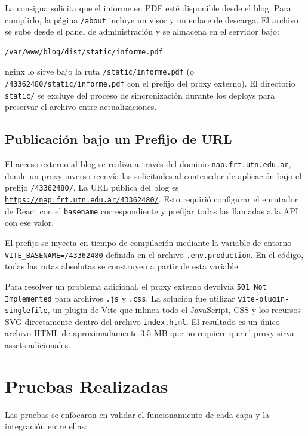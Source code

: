 \documentclass[twoside, 11pt, a4paper]{article}
\begin{document}
    La consigna solicita que el informe en PDF esté disponible desde el blog. Para cumplirlo, la página \texttt{/about} incluye un visor y un enlace de descarga. El archivo se sube desde el panel de administración y se almacena en el servidor bajo:

    \begin{verbatim}
/var/www/blog/dist/static/informe.pdf
    \end{verbatim}

    nginx lo sirve bajo la ruta \texttt{/static/informe.pdf} (o \texttt{/43362480/static/informe.pdf} con el prefijo del proxy externo). El directorio \texttt{static/} se excluye del proceso de sincronización durante los deploys para preservar el archivo entre actualizaciones.

    \subsection{Publicación bajo un Prefijo de URL}

    El acceso externo al blog se realiza a través del dominio \texttt{nap.frt.utn.edu.ar}, donde un proxy inverso reenvía las solicitudes al contenedor de aplicación bajo el prefijo \texttt{/43362480/}. La URL pública del blog es \href{https://nap.frt.utn.edu.ar/43362480/}{\texttt{https://nap.frt.utn.edu.ar/43362480/}}. Esto requirió configurar el enrutador de React con el \texttt{basename} correspondiente y prefijar todas las llamadas a la API con ese valor.

    El prefijo se inyecta en tiempo de compilación mediante la variable de entorno \texttt{VITE\_BASENAME=/43362480} definida en el archivo \texttt{.env.production}. En el código, todas las rutas absolutas se construyen a partir de esta variable.

    Para resolver un problema adicional, el proxy externo devolvía \texttt{501 Not Implemented} para archivos \texttt{.js} y \texttt{.css}. La solución fue utilizar \texttt{vite-plugin-singlefile}, un plugin de Vite que inlinea todo el JavaScript, CSS y los recursos SVG directamente dentro del archivo \texttt{index.html}. El resultado es un único archivo HTML de aproximadamente 3,5 MB que no requiere que el proxy sirva assets adicionales.

    \section{Pruebas Realizadas}

    Las pruebas se enfocaron en validar el funcionamiento de cada capa y la integración entre ellas:
\end{document}
